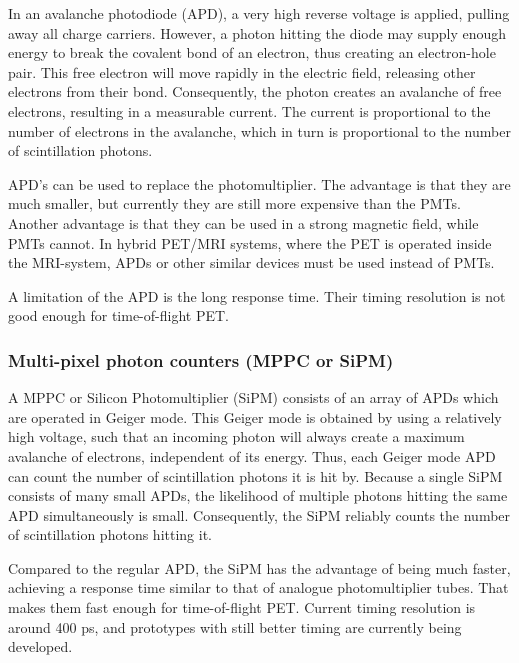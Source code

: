 In an avalanche photodiode (APD), a very high reverse voltage is applied,
pulling away all charge carriers. However, a photon hitting the diode may
supply enough energy to break the covalent bond of an electron, thus
creating an electron-hole pair. This free electron will move rapidly in the
electric field, releasing other electrons from their bond. Consequently, the
photon creates an avalanche of free electrons, resulting in a measurable
current. The current is proportional to the number of electrons in the
avalanche, which in turn is proportional to the number of
scintillation photons.

APD's can be used to replace the photomultiplier. The advantage is
that they are much smaller, but currently they are still more
expensive than the PMTs. Another advantage is that they can be used in
a strong magnetic field, while PMTs cannot. In hybrid PET/MRI systems,
where the PET is operated inside the MRI-system, APDs or other similar
devices must be used instead of PMTs.

A limitation of the APD is the long response time. Their timing
resolution is not good enough for time-of-flight PET.

\subsubsection{Multi-pixel photon counters (MPPC or SiPM)}
A MPPC or Silicon Photomultiplier (SiPM) consists of an array of APDs
which are operated in Geiger mode. This Geiger mode is obtained by
using a relatively high voltage, such that an incoming photon will
always create a maximum avalanche of electrons, independent of its
energy. Thus, each Geiger mode APD can count the number of
scintillation photons it is hit by. Because a single SiPM consists of
many small APDs, the likelihood of multiple photons hitting the same
APD simultaneously is small. Consequently, the SiPM reliably counts
the number of scintillation photons hitting it.

Compared to the regular APD, the SiPM has the advantage of being much
faster, achieving a response time similar to that of analogue
photomultiplier tubes. That makes them fast enough for time-of-flight
PET. Current timing resolution is around 400 ps, and prototypes with
still better timing are currently being developed.

